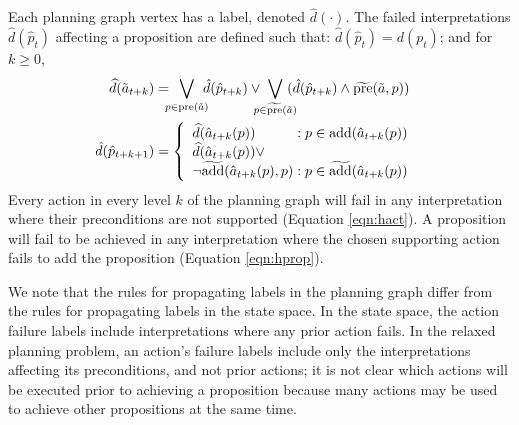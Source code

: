 \documentclass[letterpaper]{article}
\begin{document}
Each planning graph vertex has a label, denoted $\hat{d}(\cdot)$.  The failed
interpretations $\hat{d}(\hat{p}_t) $ affecting a proposition are defined such
that: $\hat{d}(\hat{p}_t) = d(p_t)$; and for $k \geq 0$,
\begin{align}
\widehat{d}(\tilde{a}_{t+k}) &= \hspace*{-.2cm} 
\bigvee\limits_{p \in \text{pre}(\tilde{a}) } \hspace*{-.2cm}   \hat{d}(\hat{p}_{t+k}) \vee \hspace*{-.25cm} 
\bigvee\limits_{p \in \widetilde{\text{pre}}(\tilde{a})} \hspace*{-.25cm}  (\hat{d}(\hat{p}_{t+k})  \wedge  \widetilde{\text{pre}}(\tilde{a}, p) )\label{eqn:hact}\\
 \hspace*{-.6cm} \hat{d}(\hat{p}_{t+k+1}) &= 
\left\{\begin{array}{l@{\;}l@{\;}r}
\widehat{d}(\hat{a}_{t+k}(p)) & : p \in \text{add}(\hat{a}_{t+k}(p))\\
\widehat{d}(\hat{a}_{t+k}(p)) \vee \\
\neg\widetilde{\text{add}}(\hat{a}_{t+k}(p), p) & : p \in \widetilde{\text{add}}(\hat{a}_{t+k}(p))\end{array}\right. \hspace*{-.1cm}\label{eqn:hprop}
\end{align}
\noindent Every action in every level $k$ of the planning graph will fail in any
interpretation where their preconditions are not supported (Equation
\ref{eqn:hact}).  A proposition will fail to be achieved in any interpretation
where the chosen supporting action fails to add the proposition (Equation
\ref{eqn:hprop}).

We note that the rules for propagating labels in the planning graph differ from
the rules for propagating labels in the state space.  In the state space, the
action failure labels include interpretations where any prior action fails.  In
the relaxed planning problem, an action's failure labels include only the
interpretations affecting its preconditions, and not prior actions; it
is not clear which actions will be executed prior to achieving a proposition
because many actions may be used to achieve other propositions at the same time.
\end{document}
